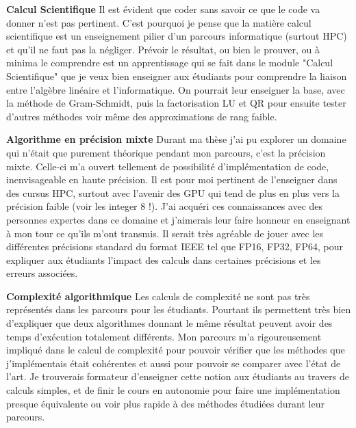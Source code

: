 \begin{flushleft}
\textbf{Calcul Scientifique} Il est évident que coder sans savoir ce que le code va donner n'est pas pertinent. C'est pourquoi je pense que la matière calcul scientifique est un enseignement pilier d'un parcours informatique (surtout HPC) et qu'il ne faut pas la négliger. Prévoir le résultat, ou bien le prouver, ou à minima le comprendre est un apprentissage qui se fait dans le module "Calcul Scientifique" que je veux bien enseigner aux étudiants pour comprendre la liaison entre l'algèbre linéaire et l'informatique. On pourrait leur enseigner la base, avec la méthode de Gram-Schmidt, puis la factorisation LU et QR pour ensuite tester d'autres méthodes voir même des approximations de rang faible.
\end{flushleft}

\begin{flushleft}
\textbf{Algorithme en précision mixte} Durant ma thèse j'ai pu explorer un domaine qui n'était que purement théorique pendant mon parcours, c'est la précision mixte. Celle-ci m'a ouvert tellement de possibilité d'implémentation de code, inenvisageable en haute précision. Il est pour moi pertinent de l'enseigner dans des cursus HPC, surtout avec l'avenir des GPU qui tend de plus en plus vers la précision faible (voir les integer 8 !). J'ai acquéri ces connaissances avec des personnes expertes dans ce domaine et j'aimerais leur faire honneur en enseignant à mon tour ce qu'ils m'ont transmis. Il serait très agréable de jouer avec les différentes précisions standard du format IEEE tel que FP16, FP32, FP64, pour expliquer aux étudiants l'impact des calculs dans certaines précisions et les erreurs associées.
\end{flushleft}

\begin{flushleft}
\textbf{Complexité algorithmique} Les calculs de complexité ne sont pas très représentés dans les parcours pour les étudiants. Pourtant ils permettent très bien d'expliquer que deux algorithmes donnant le même résultat peuvent avoir des temps d'exécution totalement différents. Mon parcours m'a rigoureusement impliqué dans le calcul de complexité pour pouvoir vérifier que les méthodes que j'implémentais était cohérentes et aussi pour pouvoir se comparer avec l'état de l'art. Je trouverais formateur d'enseigner cette notion aux étudiants au travers de calculs simples, et de finir le cours en autonomie pour faire une implémentation presque équivalente ou voir plus rapide à des méthodes étudiées durant leur parcours.
\end{flushleft}

